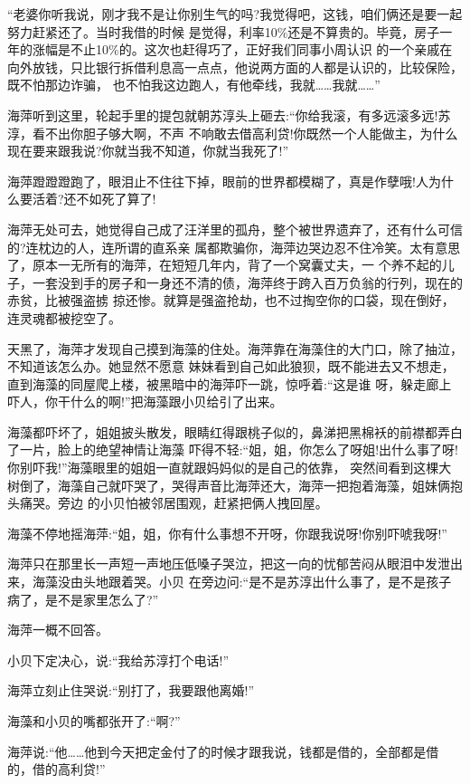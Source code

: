 \documentclass[11pt,a4paper,onecolumn]{article}
\begin{document}
``老婆你听我说，刚才我不是让你别生气的吗?我觉得吧，这钱，咱们俩还是要一起努力赶紧还了。当时我借的时候
是觉得，利率10\%还是不算贵的。毕竟，房子一年的涨幅是不止10\%的。这次也赶得巧了，正好我们同事小周认识
的一个亲戚在向外放钱，只比银行拆借利息高一点点，他说两方面的人都是认识的，比较保险，既不怕那边诈骗，
也不怕我这边跑人，有他牵线，我就……我就……''

海萍听到这里，轮起手里的提包就朝苏淳头上砸去:``你给我滚，有多远滚多远!苏淳，看不出你胆子够大啊，不声
不响敢去借高利贷!你既然一个人能做主，为什么现在要来跟我说?你就当我不知道，你就当我死了!''

海萍蹬蹬蹬跑了，眼泪止不住往下掉，眼前的世界都模糊了，真是作孽哦!人为什么要活着?还不如死了算了!

海萍无处可去，她觉得自己成了汪洋里的孤舟，整个被世界遗弃了，还有什么可信的?连枕边的人，连所谓的直系亲
属都欺骗你，海萍边哭边忍不住冷笑。太有意思了，原本一无所有的海萍，在短短几年内，背了一个窝囊丈夫，一
个养不起的儿子，一套没到手的房子和一身还不清的债，海萍终于跨入百万负翁的行列，现在的赤贫，比被强盗掳
掠还惨。就算是强盗抢劫，也不过掏空你的口袋，现在倒好，连灵魂都被挖空了。

天黑了，海萍才发现自己摸到海藻的住处。海萍靠在海藻住的大门口，除了抽泣，不知道该怎么办。她显然不愿意
妹妹看到自己如此狼狈，既不能进去又不想走，直到海藻的同屋爬上楼，被黑暗中的海萍吓一跳，惊呼着:``这是谁
呀，躲走廊上吓人，你干什么的啊!''把海藻跟小贝给引了出来。

海藻都吓坏了，姐姐披头散发，眼睛红得跟桃子似的，鼻涕把黑棉袄的前襟都弄白了一片，脸上的绝望神情让海藻
吓得不轻:``姐，姐，你怎么了呀姐!出什么事了呀!你别吓我!''海藻眼里的姐姐一直就跟妈妈似的是自己的依靠，
突然间看到这棵大树倒了，海藻自己就吓哭了，哭得声音比海萍还大，海萍一把抱着海藻，姐妹俩抱头痛哭。旁边
的小贝怕被邻居围观，赶紧把俩人拽回屋。

海藻不停地摇海萍:``姐，姐，你有什么事想不开呀，你跟我说呀!你别吓唬我呀!''

海萍只在那里长一声短一声地压低嗓子哭泣，把这一向的忧郁苦闷从眼泪中发泄出来，海藻没由头地跟着哭。小贝
在旁边问:``是不是苏淳出什么事了，是不是孩子病了，是不是家里怎么了?''

海萍一概不回答。

小贝下定决心，说:``我给苏淳打个电话!''

海萍立刻止住哭说:``别打了，我要跟他离婚!''

海藻和小贝的嘴都张开了:``啊?''

海萍说:``他……他到今天把定金付了的时候才跟我说，钱都是借的，全部都是借的，借的高利贷!''
\end{document}

